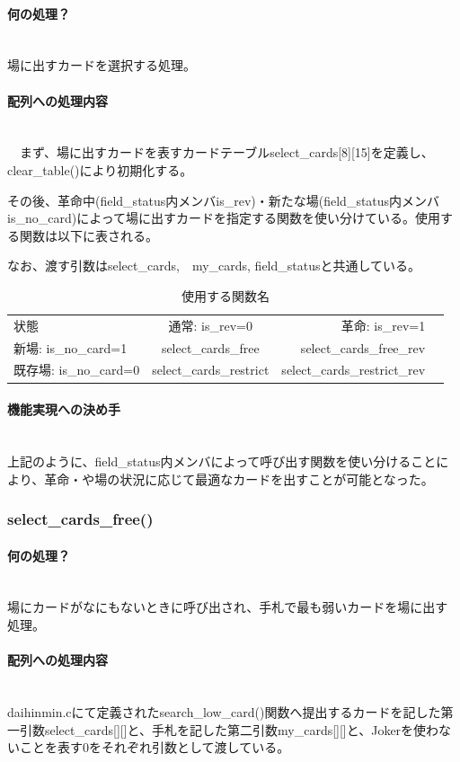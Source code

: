 \documentclass[11pt,a4paper, uplatex]{jsarticle}
\begin{document}
\paragraph{何の処理？}\mbox{}\\
場に出すカードを選択する処理。
\paragraph{配列への処理内容}\mbox{}\\
　まず、場に出すカードを表すカードテーブルselect\_cards[8][15]を定義し、clear\_table()により初期化する。

その後、革命中(field\_status内メンバis\_rev)・新たな場(field\_status内メンバis\_no\_card)によって場に出すカードを指定する関数を使い分けている。使用する関数は以下に表される。

なお、渡す引数はselect_cards,　my_cards, field_statusと共通している。
\begin{table}[hbtp]
  \caption{使用する関数名}
  \centering
  \begin{tabular}{lcrr}
    状態 & 通常: is\_rev=0 & 革命: is\_rev=1\\
    新場: is\_no\_card=1  & select_cards\_free & select\_cards\_free\_rev \\
    既存場: is\_no\_card=0  & select\_cards\_restrict & select\_cards\_restrict\_rev \\
  \end{tabular}
\end{table}
\paragraph{機能実現への決め手}\mbox{}\\
上記のように、field\_status内メンバによって呼び出す関数を使い分けることにより、革命・や場の状況に応じて最適なカードを出すことが可能となった。
%
\subsubsection{select\_cards\_free()}
\paragraph{何の処理？}\mbox{}\\
場にカードがなにもないときに呼び出され、手札で最も弱いカードを場に出す処理。
\paragraph{配列への処理内容}\mbox{}\\
daihinmin.cにて定義されたsearch\_low\_card()関数へ提出するカードを記した第一引数select\_cards[][]と、手札を記した第二引数my\_cards[][]と、Jokerを使わないことを表す0をそれぞれ引数として渡している。
\end{document}
